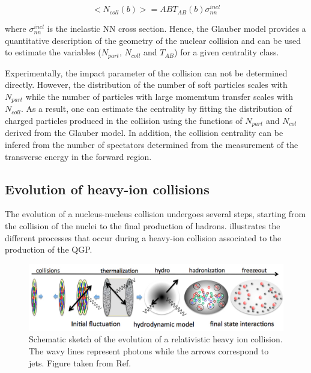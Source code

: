 \begin{equation}
<N_{coll}\left(b\right)> = {AB}T_{AB}\left(b\right)\sigma^{inel}_{nn}
\end{equation}

where $\sigma^{inel}_{nn}$ is the inelastic NN cross section. Hence, the Glauber model provides a quantitative description of the geometry of the nuclear collision and can be used to estimate the variables ($N_{part}$, $N_{coll}$ and $T_{AB}$) for a given centrality class.

Experimentally, the impact parameter of the collision can not be determined directly. However, the distribution of the number of soft particles scales with $N_{part}$ while the number of particles with large momemtum transfer scales with $N_{coll}$. As a result, one can estimate the centrality by fitting the distribution of charged particles produced in the collision using the functions of $N_{part}$ and $N_{col}$ derived from the Glauber model. In addition, the collision centrality can be infered from the number of spectators determined from the measurement of the transverse energy in the forward region.


\subsection{Evolution of heavy-ion collisions}

The evolution of a nucleus-nucleus collision undergoes several steps, starting from the collision of the nuclei to the final production of hadrons.  illustrates the different processes that occur during a heavy-ion collision associated to the production of the QGP.

\begin{figure}[!htbp]
 \begin{center}
  \includegraphics[width=1.0\textwidth]{Figures/Introduction/HeavyIons/QGPEvolution.png}
 \end{center}
 \caption{Schematic sketch of the evolution of a relativistic heavy ion collision. The wavy lines represent photons while the arrows correspond to jets. Figure taken from Ref.~\cite{QCDPhaseDiagram} }
 \label{fig:QGPEvolution}
\end{figure}

